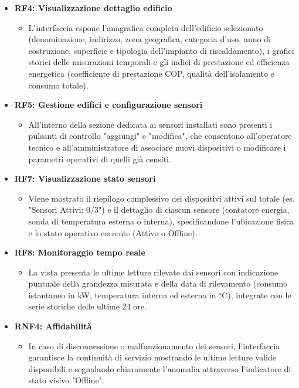\begin{itemize}
    \item \textbf{RF4: Visualizzazione dettaglio edificio}
    \begin{itemize}
        \item L'interfaccia espone l'anagrafica completa dell'edificio selezionato (denominazione, indirizzo, zona geografica, categoria d'uso, anno di costruzione, superficie e tipologia dell'impianto di riscaldamento), i grafici storici delle misurazioni temporali e gli indici di prestazione ed efficienza energetica (coefficiente di prestazione COP, qualità dell'isolamento e consumo totale).
    \end{itemize}

    \item \textbf{RF5: Gestione edifici e configurazione sensori}
    \begin{itemize}
        \item All'interno della sezione dedicata ai sensori installati sono presenti i pulsanti di controllo "aggiungi" e "modifica", che consentono all'operatore tecnico e all'amministratore di associare nuovi dispositivi o modificare i parametri operativi di quelli già censiti.
    \end{itemize}

    \item \textbf{RF7: Visualizzazione stato sensori}
    \begin{itemize}
        \item Viene mostrato il riepilogo complessivo dei dispositivi attivi sul totale (es. "Sensori Attivi: 0/3") e il dettaglio di ciascun sensore (contatore energia, sonda di temperatura esterna o interna), specificandone l'ubicazione fisica e lo stato operativo corrente (Attivo o Offline).
    \end{itemize}
    \newpage
    \item \textbf{RF8: Monitoraggio tempo reale}
    \begin{itemize}
        \item La vista presenta le ultime letture rilevate dai sensori con indicazione puntuale della grandezza misurata e della data di rilevamento (consumo istantaneo in kW, temperatura interna ed esterna in $^\circ\text{C}$), integrate con le serie storiche delle ultime 24 ore.
    \end{itemize}

    \item \textbf{RNF4: Affidabilità}
    \begin{itemize}
        \item In caso di disconnessione o malfunzionamento dei sensori, l'interfaccia garantisce la continuità di servizio mostrando le ultime letture valide disponibili e segnalando chiaramente l'anomalia attraverso l'indicatore di stato visivo "Offline".
    \end{itemize}


\end{itemize}
